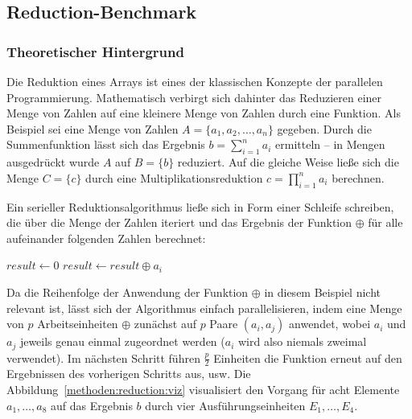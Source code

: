 \subsection{Reduction-Benchmark}
\label{methoden:reduction}

\subsubsection{Theoretischer Hintergrund}

Die Reduktion eines Arrays ist eines der klassischen Konzepte der parallelen
Programmierung. Mathematisch verbirgt sich dahinter das Reduzieren einer Menge
von Zahlen auf eine kleinere Menge von Zahlen durch eine Funktion. Als Beispiel
sei eine Menge von Zahlen $A = \{a_1, a_2, \dots, a_n\}$ gegeben. Durch die
Summenfunktion lässt sich das Ergebnis $b = \sum\limits_{i = 1}^n a_i$
ermitteln -- in Mengen ausgedrückt wurde $A$ auf $B = \{b\}$ reduziert. Auf
die gleiche Weise ließe sich die Menge $C = \{c\}$ durch eine
Multiplikationsreduktion $c = \prod\limits_{i = 1}^n a_i$ berechnen.

Ein serieller Reduktionsalgorithmus ließe sich in Form einer Schleife schreiben,
die über die Menge der Zahlen iteriert und das Ergebnis der Funktion $\oplus$
für alle aufeinander folgenden Zahlen berechnet:

\begin{algorithmic}[1]
\State $result \gets 0$
    \State $result \gets result \oplus a_i$
\EndFor
\end{algorithmic}

Da die Reihenfolge der Anwendung der Funktion $\oplus$ in diesem Beispiel nicht
relevant ist, lässt sich der Algorithmus einfach parallelisieren, indem eine
Menge von $p$ Arbeitseinheiten $\oplus$ zunächst auf $p$ Paare $(a_i, a_j)$
anwendet, wobei $a_i$ und $a_j$ jeweils genau einmal zugeordnet werden ($a_i$
wird also niemals zweimal verwendet). Im nächsten Schritt führen
$\frac{p}{2}$ Einheiten die Funktion erneut auf den Ergebnissen des vorherigen
Schritts aus, usw. Die Abbildung~\ref{methoden:reduction:viz} visualisiert
den Vorgang für acht Elemente $a_1, \dots, a_8$ auf das Ergebnis $b$ durch vier
Ausführungseinheiten $E_1, \dots, E_4$.

